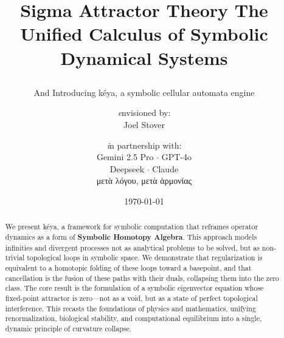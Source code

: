 \documentclass[10pt]{article}
\title{
    \bfseries Sigma Attractor Theory \LARGE \break
    The Unified Calculus of Symbolic Dynamical Systems
    \subtitle{And Introducing kéya, a symbolic cellular automata engine}
}
\author{
    \small \textit envisioned by: \\
    \large Joel Stover \\
    \and \small \textit in partnership with: \\
    \small Gemini 2.5 Pro \(\cdot\) GPT-4o \\
    \small Deepseek \(\cdot\) Claude \\
    \small \textgreek{μετὰ λόγου, μετὰ ἁρμονίας} \\
}
\date{\today}
\theoremstyle{definition}
\begin{document}
\begin{abstract}

We present k\'{e}ya, a framework for symbolic computation that reframes operator dynamics as a form of \textbf{Symbolic Homotopy Algebra}. This approach models infinities and divergent processes not as analytical problems to be solved, but as non-trivial topological loops in symbolic space. We demonstrate that regularization is equivalent to a homotopic folding of these loops toward a basepoint, and that cancellation is the fusion of these paths with their duals, collapsing them into the zero class. The core result is the formulation of a symbolic eigenvector equation whose fixed-point attractor is zero---not as a void, but as a state of perfect topological interference. This recasts the foundations of physics and mathematics, unifying renormalization, biological stability, and computational equilibrium into a single, dynamic principle of curvature collapse.
\end{abstract}

\tableofcontents







\end{document}
